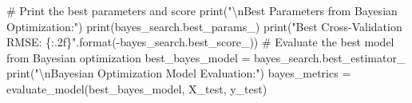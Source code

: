 \documentclass[
  letterpaper,
  DIV=11,
  numbers=noendperiod]{scrreprt}
\newenvironment{Shaded}{\begin{snugshade}}{\end{snugshade}}
\newcommand{\BuiltInTok}[1]{\textcolor[rgb]{0.00,0.23,0.31}{#1}}
\newcommand{\CharTok}[1]{\textcolor[rgb]{0.13,0.47,0.30}{#1}}
\newcommand{\CommentTok}[1]{\textcolor[rgb]{0.37,0.37,0.37}{#1}}
\newcommand{\NormalTok}[1]{\textcolor[rgb]{0.00,0.23,0.31}{#1}}
\newcommand{\OperatorTok}[1]{\textcolor[rgb]{0.37,0.37,0.37}{#1}}
\newcommand{\SpecialCharTok}[1]{\textcolor[rgb]{0.37,0.37,0.37}{#1}}
\newcommand{\StringTok}[1]{\textcolor[rgb]{0.13,0.47,0.30}{#1}}
\begin{document}
\begin{Shaded}
\begin{Highlighting}[]
\CommentTok{\# Print the best parameters and score}
\BuiltInTok{print}\NormalTok{(}\StringTok{"}\CharTok{\textbackslash{}n}\StringTok{Best Parameters from Bayesian Optimization:"}\NormalTok{)}
\BuiltInTok{print}\NormalTok{(bayes\_search.best\_params\_)}
\BuiltInTok{print}\NormalTok{(}\StringTok{"Best Cross{-}Validation RMSE: }\SpecialCharTok{\{:.2f\}}\StringTok{"}\NormalTok{.}\BuiltInTok{format}\NormalTok{(}\OperatorTok{{-}}\NormalTok{bayes\_search.best\_score\_))}
\CommentTok{\# Evaluate the best model from Bayesian optimization}
\NormalTok{best\_bayes\_model }\OperatorTok{=}\NormalTok{ bayes\_search.best\_estimator\_}
\BuiltInTok{print}\NormalTok{(}\StringTok{"}\CharTok{\textbackslash{}n}\StringTok{Bayesian Optimization Model Evaluation:"}\NormalTok{)}
\NormalTok{bayes\_metrics }\OperatorTok{=}\NormalTok{ evaluate\_model(best\_bayes\_model, X\_test, y\_test)}
\end{Highlighting}
\end{Shaded}
\end{document}
